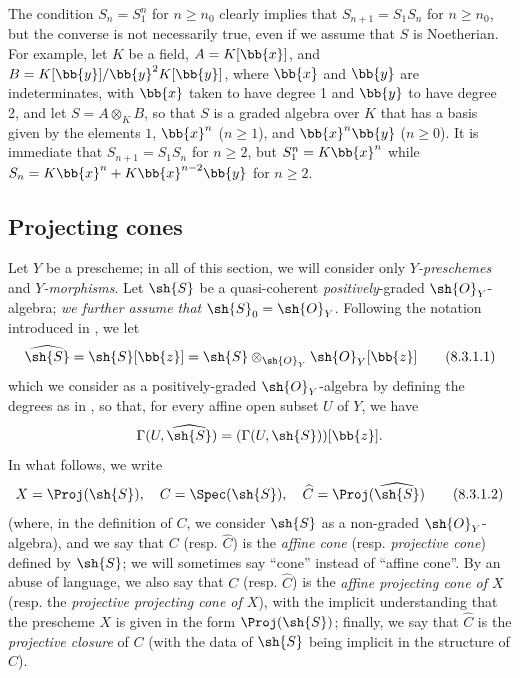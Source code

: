 \begin{remark}[8.2.15]
\label{II.8.2.15}
The condition $S_n=S_1^n$ for $n\geq n_0$ clearly implies that $S_{n+1}=S_1S_n$ for $n\geq n_0$, but the converse is not necessarily true, even if we assume that $S$ is Noetherian.
For example, let $K$ be a field, $A=K[\bb{x}]$, and $B=K[\bb{y}]/\bb{y}^2K[\bb{y}]$, where $\bb{x}$ and $\bb{y}$ are indeterminates, with $\bb{x}$ taken to have degree 1 and $\bb{y}$ to have degree 2, and let $S=A\otimes_K B$, so that $S$ is a graded algebra over $K$ that has a basis given by the elements $1$, $\bb{x}^n$ ($n\geq1$), and $\bb{x}^n\bb{y}$ ($n\geq0$).
It is immediate that $S_{n+1}=S_1S_n$ for $n\geq2$, but $S_1^n=K\bb{x}^n$ while $S_n=K\bb{x}^n+K\bb{x}^{n-2}\bb{y}$ for $n\geq2$.
\end{remark}


\subsection{Projecting cones}
\label{subsection:II.8.3}

\begin{env}[8.3.1]
\label{II.8.3.1}
Let $Y$ be a prescheme;
in all of this section, we will consider only \emph{$Y$-preschemes} and \emph{$Y$-morphisms}.
Let $\sh{S}$ be a quasi-coherent \emph{positively}-graded $\sh{O}_Y$-algebra;
\emph{we further assume that $\sh{S}_0=\sh{O}_Y$}.
Following the notation introduced in , we let
\[
\label{II.8.3.1.1}
  \widehat{\sh{S}} = \sh{S}[\bb{z}] = \sh{S} \otimes_{\sh{O}_Y} \sh{O}_Y[\bb{z}]
\tag{8.3.1.1}
\]
which we consider as a positively-graded $\sh{O}_Y$-algebra by defining the degrees as in , so that, for every affine open subset $U$ of $Y$, we have
\[
  \Gamma(U,\widehat{\sh{S}}) = (\Gamma(U,\sh{S}))[\bb{z}].
\]
In what follows, we write
\[
\label{II.8.3.1.2}
  X = \Proj(\sh{S}),
  \quad
  C = \Spec(\sh{S}),
  \quad
  \widehat{C} = \Proj(\widehat{\sh{S}})
\tag{8.3.1.2}
\]
(where, in the definition of $C$, we consider $\sh{S}$ as a non-graded $\sh{O}_Y$-algebra), and we say that $C$ (resp. $\widehat{C}$) is the \emph{affine cone} (resp. \emph{projective cone}) defined by $\sh{S}$;
we will sometimes say ``cone'' instead of ``affine cone''.
By an abuse of language, we also say that $C$ (resp. $\widehat{C}$) is the \emph{affine projecting cone of $X$} (resp. the \emph{projective projecting cone of $X$}), with the implicit understanding that the prescheme $X$ is given in the form $\Proj(\sh{S})$;
finally, we say that $\widehat{C}$ is the \emph{projective closure} of $C$ (with the data of $\sh{S}$ being implicit in the structure of $C$).
\end{env}

